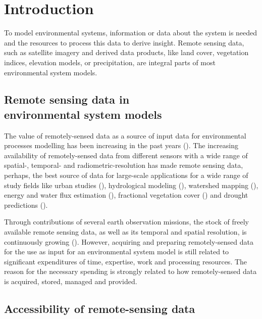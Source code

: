 \chapter{Introduction}


To model environmental systems, information or data about the system is needed and the resources to process this data to derive insight. Remote sensing data, such as satellite imagery and derived data products, like land cover, vegetation indices, elevation models, or precipitation, are integral parts of most environmental system models. 

\section{Remote sensing data in \\ environmental system models}

The value of remotely-sensed data as a source of input data for environmental processes modelling has been increasing in the past years (\cite{melesse2007remote}). The increasing availability of remotely-sensed data from different sensors with a wide range of spatial-, temporal-  and radiometric-resolution has made remote sensing data, perhaps, the best source of data for large-scale applications for a wide range of study fields like urban studies (\cite{wu2000global}), hydrological modeling (\cite{bogh2004incorporating}), watershed mapping (\cite{melesse2003spatially}), energy and water flux estimation (\cite{melesse2005estimation}), fractional vegetation cover (\cite{carlson2000impact}) and drought predictions (\cite{rhee2010monitoring}).

Through contributions of several earth observation missions, the stock of freely available remote sensing data, as well as its temporal and spatial resolution, is continuously growing (\cite{melesse2007remote}).
However, acquiring and preparing remotely-sensed data for the use as input for an environmental system model is still related to significant expenditures of time, expertise, work and processing resources. The reason for the necessary spending is strongly related to how remotely-sensed data is acquired, stored, managed and provided.

\section{Accessibility of remote-sensing data}

